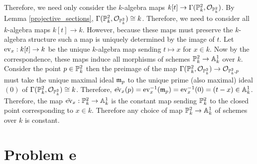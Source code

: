\documentclass[12pt]{article}
\begin{document}
Therefore, we need only consider the $k$-algebra maps $k[t] \to \Gamma(\P^2_k, \struct{\P^2_k})$. By Lemma \ref{projective_sections}, $\Gamma(\P^2_k, \struct{\P^2_k}) \cong k$. Therefore, we need to consider all $k$-algebra maps $k[t] \to k$. However, because these maps must preserve the $k$-algebra structure such a map is uniquely determined by the image of $t$. Let $\ev_x : k[t] \to k$ be the unique $k$-algebra map sending $t \mapsto x$ for $x \in k$. Now by the correspondence, these maps induce all morphisms of schemes $\P^2_k \to \A^1_k$ over $k$. Consider the point $p \in \P^2_k$ then the preimage of the map $\Gamma(\P^2_k, \struct{\P^2_k}) \to \stalk{\P^2_k}{p}$ must take the unique maximal ideal $\m_p$ to the unique prime (also maximal) ideal $(0)$ of $\Gamma(\P^2_k, \struct{\P^2_k}) \cong k$. Therefore, $\tilde{\ev}_x(p) = \ev_x^{-1}(\m_p) = \ev_x^{-1}(0) = (t - x) \in \A^1_k$. Therefore, the map $\tilde{\ev}_x : \P^2_k \to \A^1_k$ is the constant map sending $\P^2_k$ to the closed point corresponding to $x \in k$. Therefore any choice of map $\P^2_k \to \A^1_k$ of schemes over $k$ is constant. 

\section{Problem e}
\end{document}
